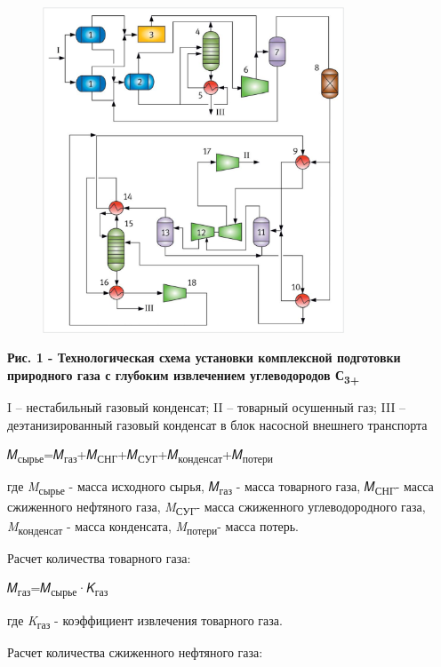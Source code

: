\begin{figure}[H]
	\centering
	\includegraphics[width=0.8\textwidth]{assets/305}
	\caption*{}
\end{figure}

{\bfseries Рис. 1 - Технологическая схема установки комплексной подготовки
природного газа с глубоким извлечением углеводородов
С\textsubscript{3+}}

I -- нестабильный газовый конденсат; II -- товарный осушенный газ; III
-- деэтанизированный газовый конденсат в блок насосной внешнего
транспорта

𝑀\textsubscript{сырье}=𝑀\textsubscript{газ}+𝑀\textsubscript{СНГ}+𝑀\textsubscript{СУГ}+𝑀\textsubscript{конденсат}+𝑀\textsubscript{потери}

где \emph{M}\textsubscript{сырье} - масса исходного сырья,
𝑀\textsubscript{газ} - масса товарного газа, 𝑀\textsubscript{СНГ}- масса
сжиженного нефтяного газа, \emph{M}\textsubscript{СУГ}- масса сжиженного
углеводородного газа, \emph{M}\textsubscript{конденсат} - масса
конденсата, \emph{M}\textsubscript{потери}- масса потерь.

Расчет количества товарного газа:

𝑀\textsubscript{газ}=𝑀\textsubscript{сырье}·𝐾\textsubscript{газ}

\hspace{0pt}где \emph{K}\textsubscript{газ} - коэффициент извлечения
товарного газа.

Расчет количества сжиженного нефтяного газа:

